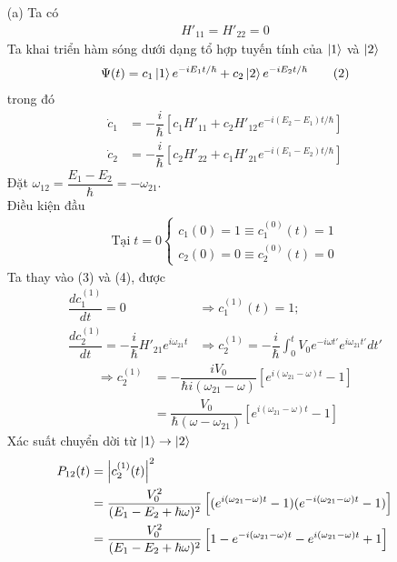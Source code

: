 \documentclass{article}
\newcommand{\f}[2]{\dfrac{#1}{#2}}
\begin{document}
\begin{enumerate}
	\item[(a)] Ta có 
	\begin{align*}
		H'_{11} = H'_{22} = 0 \tag{1}
	\end{align*}
	Ta khai triển hàm sóng dưới dạng tổ hợp tuyến tính của $\ket{1}$ và $\ket{2}$
	\begin{align*}
		\Psi(t) = c_{1} \ket{1} e^{-iE_{1} t / \hbar} + c_{2} \ket{2} e^{-iE_{2} t / \hbar} \tag{2}
	\end{align*}
	trong đó
	\begin{align*}
		\dot{c}_{1} &= -\f{i}{\hbar} \left[ c_{1} H'_{11} + c_{2} H'_{12} e^{-i(E_2 - E_1) t / \hbar} \right] \tag{3}\\
		\dot{c}_{2} &= -\f{i}{\hbar} \left[ c_{2} H'_{22} + c_{1} H'_{21} e^{-i(E_1 - E_2) t / \hbar} \right] \tag{4}
	\end{align*}
	Đặt $\omega_{12} = \f{E_{1} - E_{2}}{\hbar} = - \omega_{21}$.\\
	Điều kiện đầu
	\begin{align*}
		\text{Tại} \; t = 0
		\begin{cases}
			c_{1}(0) = 1 \equiv c_{1}^{(0)}(t) = 1 \\
			c_{2}(0) = 0 \equiv c_{2}^{(0)}(t) = 0 
		\end{cases} \tag{5}
	\end{align*}
	Ta thay vào (3) và (4), được
	\begin{align*}
		\f{d c_{1}^{(1)}}{dt} = 0 &\Rightarrow c_{1}^{(1)}(t) = 1; \\
		\f{d c_{2}^{(1)}}{dt} = -\f{i}{\hbar}H'_{21} e^{i\omega_{21} t} &\Rightarrow c_{2}^{(1)} = - \f{i}{\hbar} \int_{0}^{t} V_{0}e^{-i\omega t'} e^{i\omega_{21} t'} dt' 
	\end{align*}
	\begin{align*}
		\Rightarrow c_{2}^{(1)} 
		&= -\f{i V_{0}}{\hbar i (\omega_{21} - \omega)} \left[e^{i(\omega_{21} - \omega) t} - 1\right]\\
		&= \f{V_{0}}{\hbar (\omega - \omega_{21})} \left[e^{i(\omega_{21} - \omega) t} - 1\right] \tag{6}
	\end{align*}
	Xác suất chuyển dời từ $\ket{1} \rightarrow \ket{2}$
	\begin{align*}
		P_{12}(t) 
		&= \abs{c_{2}^{(1)}(t)}^2\\
		&= \f{V_{0}^2}{(E_{1} - E_{2} + \hbar \omega)^2} \left[(e^{i(\omega_{21} - \omega) t} - 1)(e^{-i(\omega_{21} - \omega) t} - 1)\right]\\
		&= \f{V_{0}^2}{(E_{1} - E_{2} + \hbar \omega)^2} \left[1 - e^{-i(\omega_{21} - \omega) t} -e^{i(\omega_{21} - \omega) t} + 1 \right] \\

\end{align*}
\end{enumerate}
\end{document}
